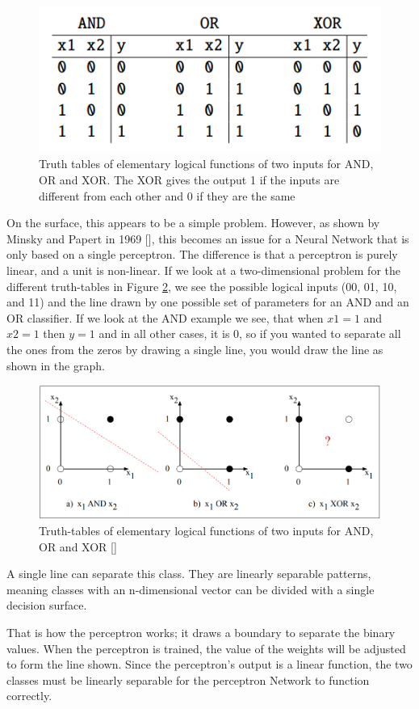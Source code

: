 \begin{figure}
  \centering
  \includegraphics[width=0.5\linewidth]{Pictures/truthtable.PNG}
  \caption{Truth tables of elementary logical functions of two inputs for AND, OR and XOR. The XOR gives the output 1 if the inputs are different from each other and 0 if they are the same }
  \label{fig:truthtables}
\end{figure}

On the surface, this appears to be a simple problem. However, as shown by Minsky and Papert in 1969 [\cite{minsky69perceptrons}], this becomes an issue for a Neural Network that is only based on a single perceptron. The difference is that a perceptron is purely linear, and a unit is non-linear. If we look at a two-dimensional problem for the different truth-tables in Figure \ref{fig:xorgraph}, we see the possible logical inputs (00, 01, 10, and 11) and the line drawn
by one possible set of parameters for an AND and an OR classifier. 
If we look at the AND example we see, that when $x1=1$ and $x2=1$ then $y=1$ and in all other cases, it is 0, so if you wanted to separate all the ones from the zeros by drawing a single line, you would draw the line as shown in the graph.

\begin{figure}[h]
  \centering
  \includegraphics[width=0.7\linewidth]{Pictures/XORgraph.PNG}
  \caption{Truth-tables of elementary logical functions of two inputs for AND, OR and XOR [\cite{Jurafsky2009}]}
  \label{fig:xorgraph}
\end{figure}

A single line can separate this class. They are linearly separable patterns, meaning classes with an n-dimensional vector can be divided with a single decision surface.

That is how the perceptron works; it draws a boundary to separate the binary values. When the perceptron is trained, the value of the weights will be adjusted to form the line shown. Since the perceptron's output is a linear function, the two classes must be linearly separable for the perceptron Network to function correctly. 

